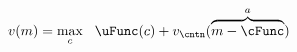   \begin{equation}\begin{gathered}\begin{aligned}
        \vFunc(\mNrm) & = \max_{\cNrm}~~\uFunc(\cNrm) +\vFunc_{\cntn}(\overbrace{\mNrm-\cFunc}^{\aNrm}) \label{eq:vMid}
      \end{aligned}\end{gathered}\end{equation}
